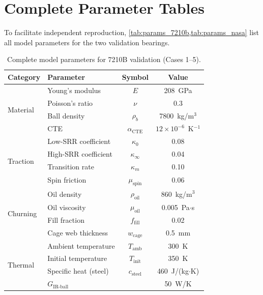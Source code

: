 \documentclass[preprint,12pt]{elsarticle}
\begin{document}
\appendix
\section{Complete Parameter Tables}
\label{sec:appendix_params}

To facilitate independent reproduction, \cref{tab:params_7210b,tab:params_nasa} list all model parameters for the two validation bearings.

\begin{table}[htbp]
    \centering
    \caption{Complete model parameters for 7210B validation (Cases 1--5).}
    \label{tab:params_7210b}
    \small
    \begin{tabular}{@{}llcc@{}}
        \toprule
        Category & Parameter & Symbol & Value \\
        \midrule
        \multirow{4}{*}{Material}
        & Young's modulus & $E$ & 208~GPa \\
        & Poisson's ratio & $\nu$ & 0.3 \\
        & Ball density & $\rho_b$ & 7800~kg/m$^3$ \\
        & CTE & $\alpha_{\text{CTE}}$ & $12 \times 10^{-6}$~K$^{-1}$ \\
        \midrule
        \multirow{4}{*}{Traction}
        & Low-SRR coefficient & $\kappa_0$ & 0.08 \\
        & High-SRR coefficient & $\kappa_\infty$ & 0.04 \\
        & Transition rate & $\kappa_m$ & 0.10 \\
        & Spin friction & $\mu_{\text{spin}}$ & 0.06 \\
        \midrule
        \multirow{4}{*}{Churning}
        & Oil density & $\rho_{\text{oil}}$ & 860~kg/m$^3$ \\
        & Oil viscosity & $\mu_{\text{oil}}$ & 0.005~Pa$\cdot$s \\
        & Fill fraction & $f_{\text{fill}}$ & 0.02 \\
        & Cage web thickness & $w_{\text{cage}}$ & 0.5~mm \\
        \midrule
        \multirow{6}{*}{Thermal}
        & Ambient temperature & $T_{\text{amb}}$ & 300~K \\
        & Initial temperature & $T_{\text{init}}$ & 350~K \\
        & Specific heat (steel) & $c_{\text{steel}}$ & 460~J/(kg$\cdot$K) \\
        & $G_{\text{IR-ball}}$ & & 50~W/K \\

\end{tabular}
\end{table}
\end{document}

